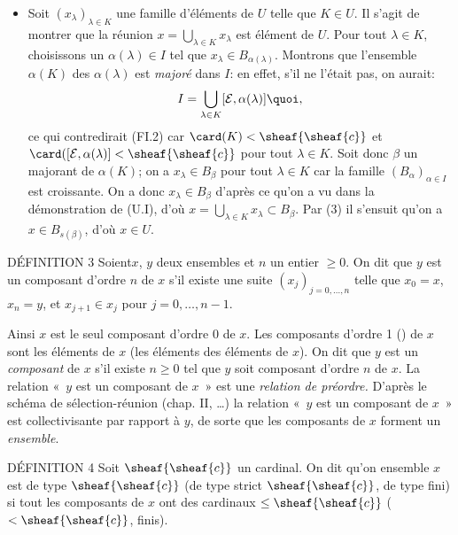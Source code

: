 \begin{itemize}
\item[(U.IV)] Soit $(x_{\lambda})_{\lambda\in K}$ une famille
d'éléments de $U$ telle que $K\in U$. Il s'agit de montrer que la
réunion $x=\bigcup_{\lambda\in K}x_{\lambda}$ est élément de $U$.
Pour tout $\lambda\in K$, choisissons un $\alpha(\lambda)\in I$ tel
que $x_{\lambda}\in B_{\alpha(\lambda)}$. Montrons que l'ensemble
$\alpha(K)$ des $\alpha(\lambda)$ est \emph{majoré} dans $I$: en
effet, s'il ne l'était pas, on aurait:
$$
I=\bigcup_{\lambda%
\in K}[\mathcal{E}, \alpha(\lambda)]{\quoi},
$$
ce qui contredirait (FI.2) car $\card(K)<\sheaf{\sheaf{c}}$ et
$\card([\mathcal{E},\alpha(\lambda)]<\sheaf{\sheaf{c}}$ pour tout
$\lambda\in K$. Soit donc $\beta$ un majorant de $\alpha(K)$; on a
$x_{\lambda}\in B_{\beta}$ pour tout $\lambda\in K$ car la famille
$(B_{\alpha})_{\alpha \in I}$ est croissante. On a donc
$x_{\lambda}\in B_{\beta}$ d'après ce qu'on a vu dans la
démonstration de (U.I), d'où $x=\bigcup_{\lambda\in
K}x_{\lambda}\subset B_{\beta}$. Par (3) il s'ensuit qu'on a $x\in
B_{s(\beta)}$, d'où $x\in U$. \cqfd
\end{itemize}

\begin{enonce*}{DÉFINITION 3}
Soient\pageoriginale $x$, $y$ deux ensembles et $n$ un entier $\geq
0$. On dit que $y$ est un composant d'ordre $n$ de $x$ s'il existe
une suite $(x_j)_{j=0,\ldots,n}$ telle que $x_0=x$, $x_n=y$, et
$x_{j+1}\in x_j$ pour $j=0,\ldots,n-1$.
\end{enonce*}

Ainsi $x$ est le seul composant d'ordre 0 de $x$. Les composants
d'ordre 1 () de $x$ sont les éléments de $x$ (\resp les
éléments des éléments de $x$). On dit que $y$ est un
\emph{composant} de $x$ s'il existe $n\geq 0$ tel que $y$ soit
composant d'ordre $n$ de $x$. La relation « $y$ est un composant
de $x$ » est une \emph{relation de préordre.} D'après le schéma
de sélection-réunion (chap. II, \ldots) la relation « $y$ est un
composant de $x$ » est collectivisante par rapport à $y$, de
sorte que les composants de $x$ forment un \emph{ensemble}.

\begin{enonce*}{DÉFINITION 4}
Soit $\sheaf{\sheaf{c}}$ un cardinal. On dit qu'on ensemble $x$ est
de type $\sheaf{\sheaf{c}}$ (\resp de type strict
$\sheaf{\sheaf{c}}$, de type fini) si tout les composants de $x$ ont
des cardinaux $\leq \sheaf{\sheaf{c}}$ (\resp $<\sheaf{\sheaf{c}}$,
finis).
\end{enonce*}

